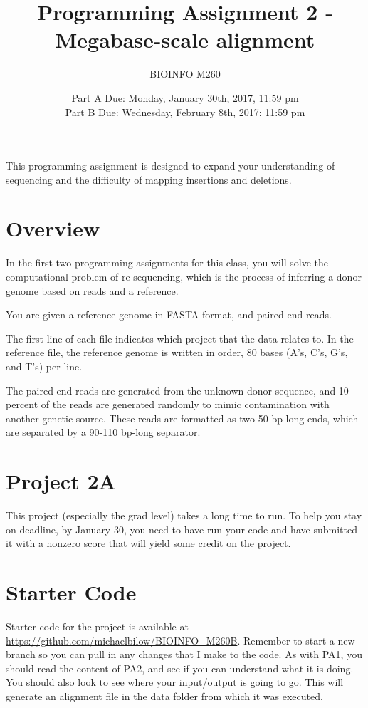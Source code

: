 \documentclass{article}
\begin{document}
\title{Programming Assignment 2 - Megabase-scale alignment}

\author{BIOINFO M260}

\date{Part A Due: Monday, January 30th, 2017, 11:59 pm \\ Part B Due: Wednesday, February 8th, 2017: 11:59 pm}

\maketitle

This programming assignment is designed to expand your understanding of sequencing and the difficulty of mapping insertions and deletions.

\section*{Overview}
In the first two programming assignments for this class, you will solve the computational problem of re-sequencing, which is the process of inferring a donor genome based on reads and a reference. 

You are given a reference genome in FASTA format, and paired-end reads.

The first line of each file indicates which project that the data relates to. In the reference file, the reference genome is written in order, 80 bases (A's, C's, G's, and T's) per line.

The paired end reads are generated from the unknown donor sequence, and 10 percent of the reads are generated randomly to mimic contamination with another genetic source. These reads are formatted as two 50 bp-long ends, which are separated by a 90-110 bp-long separator. 


\section*{Project 2A}

This project (especially the grad level) takes a long time to run. To help you stay on deadline, by January 30, you need to have run your code and have submitted it with a nonzero score that will yield some credit on the project.  

\section*{Starter Code}

Starter code for the project is available at \url{https://github.com/michaelbilow/BIOINFO_M260B}. Remember to start a new branch so you can pull in any changes that I make to the code.  As with PA1, you should read the content of PA2, and see if you can understand what it is doing. You should also look to see where your input/output is going to go. This will generate an alignment file in the data folder from which it was executed.
\end{document}
